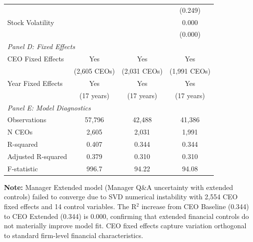 \begin{table}[htbp]
\begin{tabular}{@{}lccc@{}}
& & & (0.249) \\[0.5em]
Stock Volatility & & & 0.000 \\
& & & (0.000) \\
\midrule
\multicolumn{4}{l}{\textit{Panel D: Fixed Effects}} \\
\midrule
CEO Fixed Effects & Yes & Yes & Yes \\
& (2,605 CEOs) & (2,031 CEOs) & (1,991 CEOs) \\[0.3em]
Year Fixed Effects & Yes & Yes & Yes \\
& (17 years) & (17 years) & (17 years) \\
\midrule
\multicolumn{4}{l}{\textit{Panel E: Model Diagnostics}} \\
\midrule
Observations & 57,796 & 42,488 & 41,386 \\
N CEOs & 2,605 & 2,031 & 1,991 \\
R-squared & 0.407 & 0.344 & 0.344 \\
Adjusted R-squared & 0.379 & 0.310 & 0.310 \\
F-statistic & 996.7 & 94.22 & 94.08 \\
\bottomrule
\end{tabular}

\vspace{1em}
\parbox{\textwidth}{\footnotesize
\textbf{Note:} Manager Extended model (Manager Q\&A uncertainty with extended controls)
failed to converge due to SVD numerical instability with 2,554 CEO fixed effects
and 14 control variables. The R$^2$ increase from CEO Baseline (0.344) to CEO Extended
(0.344) is 0.000, confirming that extended financial controls do not materially
improve model fit. CEO fixed effects capture variation orthogonal to standard
firm-level financial characteristics.
}

\end{table}
